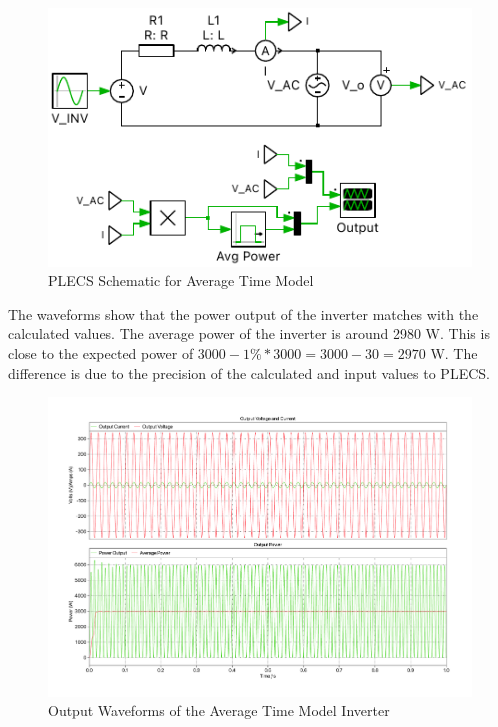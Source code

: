 \documentclass[12pt]{article}
\begin{document}
\begin{figure}[ht]
    \centering{}
    \includegraphics[width=\textwidth, height=0.4\textheight, keepaspectratio]{img/Average Time Model.pdf}
    \caption{PLECS Schematic for Average Time Model}
    \label{fig:avg-time-model}
\end{figure}

The waveforms show that the power output of the inverter matches with the calculated values.
The average power of the inverter is around 2980 W.
This is close to the expected power of $3000 - 1\% * 3000 = 3000 - 30 = 2970$ W.
The difference is due to the precision of the calculated and input values to PLECS.

\begin{figure}[ht]
    \centering{}
    \includegraphics[width=\textwidth, height=0.4\textheight, keepaspectratio]{img/Average Time Power.pdf}
    \caption{Output Waveforms of the Average Time Model Inverter}
    \label{fig:avg-time-waveform}
\end{figure}
\end{document}
